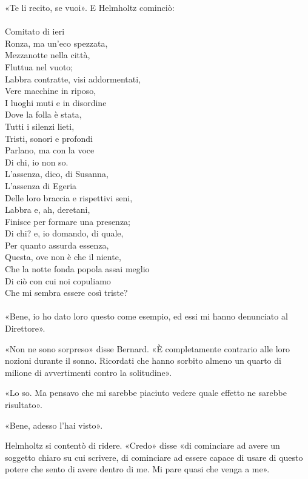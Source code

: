 \documentclass[
a5paper, %
10pt, %
twoside, 
onecolumn, %
openany, %
]{memoir}
\begin{document}
«Te li recito, se vuoi». E Helmholtz cominciò:
\leavevmode\\\leavevmode\\
{\tiny Comitato di ieri\\
Ronza, ma un’eco spezzata,\\
Mezzanotte nella città,\\
Fluttua nel vuoto;\\
Labbra contratte, visi addormentati,\\
Vere macchine in riposo,\\
I luoghi muti e in disordine\\
Dove la folla è stata,\\
Tutti i silenzi lieti,\\
Tristi, sonori e profondi\\
Parlano, ma con la voce\\
Di chi, io non so.\\
L’assenza, dico, di Susanna,\\
L’assenza di Egeria\\
Delle loro braccia e rispettivi seni,\\
Labbra e, ah, deretani,\\
Finisce per formare una presenza;\\
Di chi? e, io domando, di quale,\\
Per quanto assurda essenza,\\
Questa, ove non è che il niente,\\
Che la notte fonda popola assai meglio\\
Di ciò con cui noi copuliamo\\
Che mi sembra essere così triste?}
\leavevmode\\\leavevmode\\
«Bene, io ho dato loro questo come esempio, ed essi mi hanno denunciato al Direttore».

«Non ne sono sorpreso» disse Bernard. «È completamente contrario alle loro nozioni durante il sonno. Ricordati che hanno sorbito almeno un quarto di milione di avvertimenti contro la solitudine».

«Lo so. Ma pensavo che mi sarebbe piaciuto vedere quale effetto ne sarebbe risultato».

«Bene, adesso l’hai visto».

Helmholtz si contentò di ridere. «Credo» disse «di cominciare ad avere un soggetto chiaro su cui scrivere, di cominciare ad essere capace di usare di questo potere che sento di avere dentro di me. Mi pare quasi che venga a me».
\end{document}
